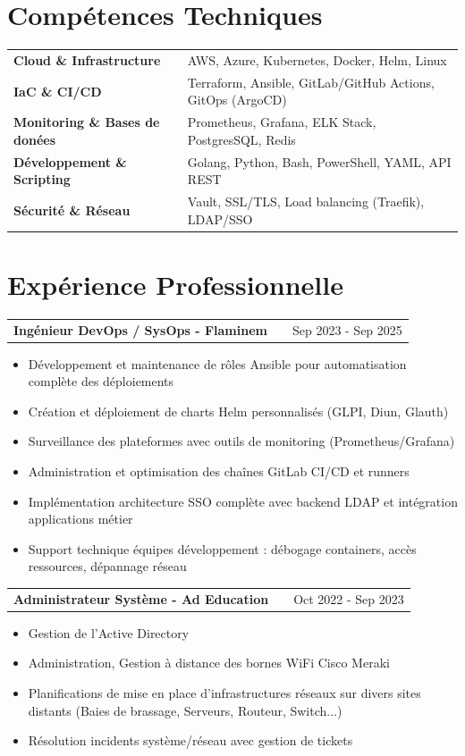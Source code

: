 \documentclass[a4paper,11pt]{article}
\makeatletter
\newenvironment{joblong}[2]
    {
    \begin{tabularx}{\linewidth}{@{}l X r@{}}
    \textbf{#1} & \hfill &  #2 \\[3.75pt]
    \end{tabularx}
    \begin{minipage}[t]{\linewidth}
    \begin{itemize}[nosep,after=\strut, leftmargin=1em, itemsep=3pt,label=--]
    }
    {
    \end{itemize}
    \end{minipage}    
    }
\makeatother
\begin{document}
\section{Compétences Techniques}
\begin{tabularx}{\linewidth}{@{}l X@{}}
\textbf{Cloud \& Infrastructure} & AWS, Azure, Kubernetes, Docker, Helm, Linux \\[3pt]
\textbf{IaC \& CI/CD} & Terraform, Ansible, GitLab/GitHub Actions, GitOps (ArgoCD) \\[3pt]
\textbf{Monitoring \& Bases de donées} & Prometheus, Grafana, ELK Stack, PostgresSQL, Redis \\[3pt]
\textbf{Développement \& Scripting} & Golang, Python, Bash, PowerShell, YAML, API REST \\[3pt]
\textbf{Sécurité \& Réseau} & Vault, SSL/TLS, Load balancing (Traefik), LDAP/SSO \\[3pt]
\end{tabularx}

\section{Expérience Professionnelle}

\begin{joblong}{Ingénieur DevOps / SysOps - Flaminem}{Sep 2023 - Sep 2025}
\item Développement et maintenance de rôles Ansible pour automatisation complète des déploiements
\item Création et déploiement de charts Helm personnalisés (GLPI, Diun, Glauth)
\item Surveillance des plateformes avec outils de monitoring (Prometheus/Grafana)
\item Administration et optimisation des chaînes GitLab CI/CD et runners
\item Implémentation architecture SSO complète avec backend LDAP et intégration applications métier
\item Support technique équipes développement : débogage containers, accès ressources, dépannage réseau
\end{joblong}

\begin{joblong}{Administrateur Système - Ad Education}{Oct 2022 - Sep 2023}
\item Gestion de l'Active Directory
\item Administration, Gestion à distance des bornes WiFi Cisco Meraki
\item Planifications de mise en place d'infrastructures réseaux sur divers sites distants (Baies de brassage, Serveurs, Routeur, Switch...)
\item Résolution incidents système/réseau avec gestion de tickets
\end{joblong}
  
\end{document}
